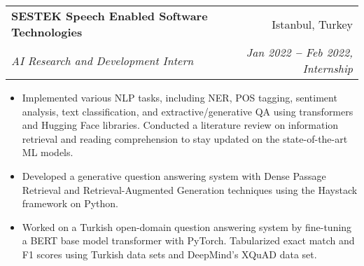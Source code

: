 \documentclass[letterpaper,11pt]{article}
\makeatletter
\newcommand{\resumeItem}[1]{
  \item\small{
    {#1 \vspace{-2pt}}
  }
}
\newcommand{\resumeSubheading}[4]{
  \vspace{-2pt}\item
    \begin{tabular*}{0.97\textwidth}[t]{l@{\extracolsep{\fill}}r}
      \textbf{#1} & #2 \\
      \textit{\small#3} & \textit{\small #4} \\
    \end{tabular*}\vspace{-7pt}
}
\newcommand{\resumeItemListStart}{\begin{itemize}}
\newcommand{\resumeItemListEnd}{\end{itemize}\vspace{-5pt}}
\makeatother
\begin{document}
    
    \resumeSubheading
      {SESTEK Speech Enabled Software Technologies}{Istanbul, Turkey}
      {AI Research and Development Intern}{Jan 2022 \textbf{--} Feb 2022, Internship}
        \resumeItemListStart
            \resumeItem{Implemented various NLP tasks, including NER, POS tagging, sentiment analysis, text classification, and extractive/generative QA using transformers and Hugging Face libraries. Conducted a literature review on information retrieval and reading comprehension to stay updated on the state-of-the-art ML models.}
            \resumeItem{Developed a generative question answering system with Dense Passage Retrieval and Retrieval-Augmented Generation techniques using the Haystack framework on Python.}
            \resumeItem{Worked on a Turkish open-domain question answering system by fine-tuning a BERT base model transformer with PyTorch. Tabularized exact match and F1 scores using Turkish data sets and DeepMind's XQuAD data set.}
        \resumeItemListEnd
    
\end{document}
